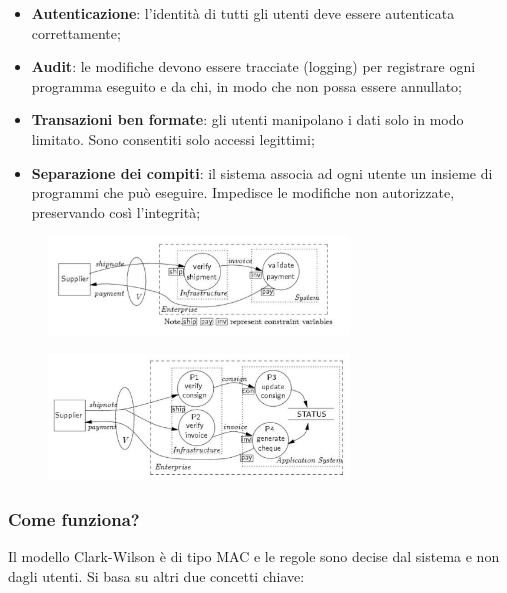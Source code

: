 \begin{itemize}
      \item \textbf{Autenticazione}: l'identità di tutti gli utenti deve essere
            autenticata correttamente;
      \item \textbf{Audit}: le modifiche devono essere tracciate (logging) per registrare ogni
            programma eseguito e da chi,
            in modo che non possa essere annullato;
      \item \textbf{Transazioni ben formate}: gli utenti manipolano i dati solo in modo
            limitato. Sono consentiti
            solo accessi legittimi;
      \item \textbf{Separazione dei compiti}: il sistema associa ad ogni utente un
            insieme di programmi che
            può eseguire. Impedisce le modifiche non autorizzate, preservando
            così l'integrità;
\end{itemize}

\begin{figure}[H]
      \centering
      \includegraphics[width=8cm, keepaspectratio]{capitoli/policy/imgs/clark_wilson.png}
\end{figure}
\begin{figure}[H]
      \centering
      \includegraphics[width=8cm, keepaspectratio]{capitoli/policy/imgs/clark_wilson2.png}
\end{figure}

\subsubsection{Come funziona?}

Il modello Clark-Wilson è di tipo MAC e le regole sono decise dal sistema e non
dagli utenti.
Si basa su altri due concetti chiave:

